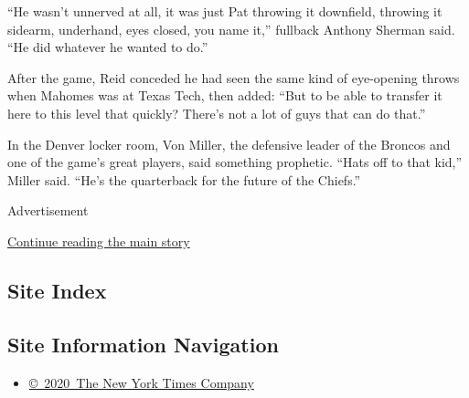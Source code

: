 ``He wasn't unnerved at all, it was just Pat throwing it downfield,
throwing it sidearm, underhand, eyes closed, you name it,'' fullback
Anthony Sherman said. ``He did whatever he wanted to do.''

After the game, Reid conceded he had seen the same kind of eye-opening
throws when Mahomes was at Texas Tech, then added: ``But to be able to
transfer it here to this level that quickly? There's not a lot of guys
that can do that.''

In the Denver locker room, Von Miller, the defensive leader of the
Broncos and one of the game's great players, said something prophetic.
``Hats off to that kid,'' Miller said. ``He's the quarterback for the
future of the Chiefs.''

Advertisement

\protect\hyperlink{after-bottom}{Continue reading the main story}

\hypertarget{site-index}{%
\subsection{Site Index}\label{site-index}}

\hypertarget{site-information-navigation}{%
\subsection{Site Information
Navigation}\label{site-information-navigation}}

\begin{itemize}
\tightlist
\item
  \href{https://help.nytimes3xbfgragh.onion/hc/en-us/articles/115014792127-Copyright-notice}{©~2020~The
  New York Times Company}
\end{itemize}

